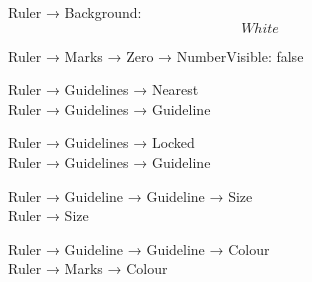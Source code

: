 \documentclass[
]{book}
\begin{document}
Ruler → Background: \[ White \]

Ruler → Marks → Zero → NumberVisible: false

Ruler → Guidelines → Nearest\\
\hspace*{0.333em}\hspace*{0.333em}\hspace*{0.333em}\hspace*{0.333em}Ruler → Guidelines → Guideline

Ruler → Guidelines → Locked\\
\hspace*{0.333em}\hspace*{0.333em}\hspace*{0.333em}\hspace*{0.333em}Ruler → Guidelines → Guideline

Ruler → Guideline → Guideline → Size\\
\hspace*{0.333em}\hspace*{0.333em}\hspace*{0.333em}\hspace*{0.333em}\hspace*{0.333em}Ruler → Size

Ruler → Guideline → Guideline → Colour\\
\hspace*{0.333em}\hspace*{0.333em}\hspace*{0.333em}\hspace*{0.333em}\hspace*{0.333em}Ruler → Marks → Colour
\end{document}
